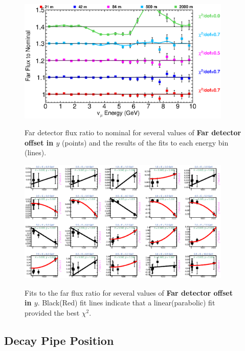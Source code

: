 \begin{figure}[ht]
  \begin{center}
    {\includegraphics[width=4.0in]{figures/LBNEFDY_far_summary.eps}}
  \end{center}
\caption{ Far detector flux ratio to nominal for several values of {\bf Far detector offset in $y$} (points) and the results of the fits to each energy bin (lines).}
\end{figure}

\begin{figure}[hb]
  \begin{center}
    {\includegraphics[width=4.0in]{figures/LBNEFDY_far_fits.eps}}
  \end{center}
\caption{ Fits to the far flux ratio for several values of {\bf Far detector offset in $y$}. Black(Red) fit lines indicate that a linear(parabolic) fit provided the best $\chi^2$. }
\end{figure}

\clearpage
\subsection{Decay Pipe Position}

